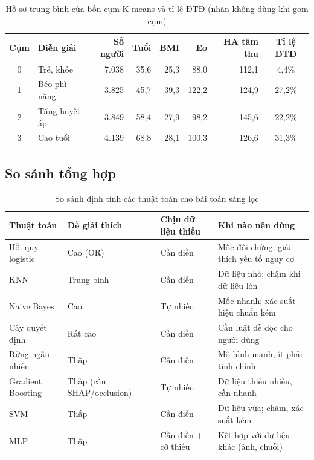 \begin{table}[H]
\centering
\caption{Hồ sơ trung bình của bốn cụm K-means và tỉ lệ ĐTĐ (nhãn không dùng khi gom cụm)}
\label{tab:ch2-km}
\small
\begin{adjustbox}{max width=\linewidth}
\begin{tabular}{@{}clrrrrrc@{}}
\toprule
\textbf{Cụm} & \textbf{Diễn giải} & \textbf{Số người} & \textbf{Tuổi} & \textbf{BMI} & \textbf{Eo} & \textbf{HA tâm thu} & \textbf{Tỉ lệ ĐTĐ} \\
\midrule
0 & Trẻ, khỏe & 7.038 & 35,6 & 25,3 & 88,0 & 112,1 & 4,4\% \\
1 & Béo phì nặng & 3.825 & 45,7 & 39,3 & 122,2 & 124,9 & 27,2\% \\
2 & Tăng huyết áp & 3.849 & 58,4 & 27,9 & 98,2 & 145,6 & 22,2\% \\
3 & Cao tuổi & 4.139 & 68,8 & 28,1 & 100,3 & 126,6 & 31,3\% \\
\bottomrule
\end{tabular}
\end{adjustbox}
\end{table}

\subsection{So sánh tổng hợp}

\begin{table}[H]
\centering
\caption{So sánh định tính các thuật toán cho bài toán sàng lọc}
\label{tab:ch2-compare}
\small
\begin{tabularx}{\linewidth}{@{}L{2.8cm}L{2.2cm}L{2.0cm}Y@{}}
\toprule
\textbf{Thuật toán} & \textbf{Dễ giải thích} & \textbf{Chịu dữ liệu thiếu} & \textbf{Khi nào nên dùng} \\
\midrule
Hồi quy logistic & Cao (OR) & Cần điền & Mốc đối chứng; giải thích yếu tố nguy cơ \\
KNN & Trung bình & Cần điền & Dữ liệu nhỏ; chậm khi dữ liệu lớn \\
Naive Bayes & Cao & Tự nhiên & Mốc nhanh; xác suất hiệu chuẩn kém \\
Cây quyết định & Rất cao & Cần điền & Cần luật dễ đọc cho người dùng \\
Rừng ngẫu nhiên & Thấp & Cần điền & Mô hình mạnh, ít phải tinh chỉnh \\
Gradient Boosting & Thấp (cần SHAP/occlusion) & Tự nhiên & Dữ liệu thiếu nhiều, cần nhanh \\
SVM & Thấp & Cần điền & Dữ liệu vừa; chậm, xác suất kém \\
MLP & Thấp & Cần điền + cờ thiếu & Kết hợp với dữ liệu khác (ảnh, chuỗi) \\
\bottomrule
\end{tabularx}
\end{table}

